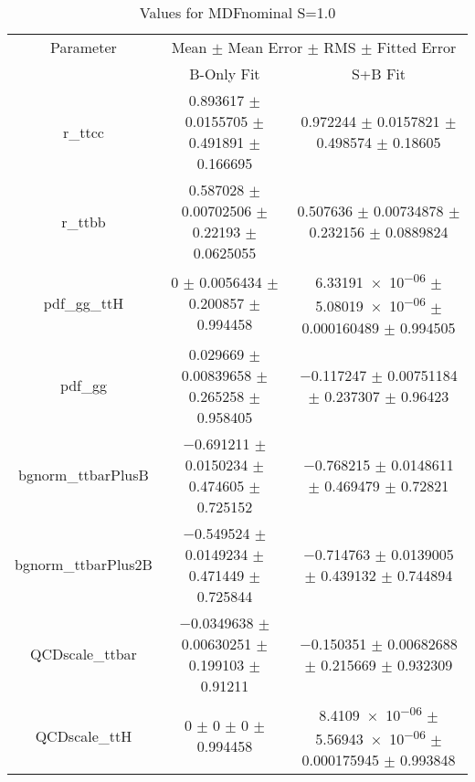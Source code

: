 \begin{table}
\centering
\caption{Values for MDFnominal S=1.0}
\begin{tabular}{ccc}
\toprule
Parameter & \multicolumn{2}{c}{Mean $\pm$ Mean Error $\pm$ RMS $\pm$ Fitted Error}\\
 & B-Only Fit & S+B Fit\\
\midrule
r\_ttcc & \num{0.893617} $\pm$ \num{0.0155705} $\pm$ \num{0.491891} $\pm$ \num{0.166695} & \num{0.972244} $\pm$ \num{0.0157821} $\pm$ \num{0.498574} $\pm$ \num{0.18605}\\
r\_ttbb & \num{0.587028} $\pm$ \num{0.00702506} $\pm$ \num{0.22193} $\pm$ \num{0.0625055} & \num{0.507636} $\pm$ \num{0.00734878} $\pm$ \num{0.232156} $\pm$ \num{0.0889824}\\
pdf\_gg\_ttH & \num{0} $\pm$ \num{0.0056434} $\pm$ \num{0.200857} $\pm$ \num{0.994458} & \num{6.33191e-06} $\pm$ \num{5.08019e-06} $\pm$ \num{0.000160489} $\pm$ \num{0.994505}\\
pdf\_gg & \num{0.029669} $\pm$ \num{0.00839658} $\pm$ \num{0.265258} $\pm$ \num{0.958405} & \num{-0.117247} $\pm$ \num{0.00751184} $\pm$ \num{0.237307} $\pm$ \num{0.96423}\\
bgnorm\_ttbarPlusB & \num{-0.691211} $\pm$ \num{0.0150234} $\pm$ \num{0.474605} $\pm$ \num{0.725152} & \num{-0.768215} $\pm$ \num{0.0148611} $\pm$ \num{0.469479} $\pm$ \num{0.72821}\\
bgnorm\_ttbarPlus2B & \num{-0.549524} $\pm$ \num{0.0149234} $\pm$ \num{0.471449} $\pm$ \num{0.725844} & \num{-0.714763} $\pm$ \num{0.0139005} $\pm$ \num{0.439132} $\pm$ \num{0.744894}\\
QCDscale\_ttbar & \num{-0.0349638} $\pm$ \num{0.00630251} $\pm$ \num{0.199103} $\pm$ \num{0.91211} & \num{-0.150351} $\pm$ \num{0.00682688} $\pm$ \num{0.215669} $\pm$ \num{0.932309}\\
QCDscale\_ttH & \num{0} $\pm$ \num{0} $\pm$ \num{0} $\pm$ \num{0.994458} & \num{8.4109e-06} $\pm$ \num{5.56943e-06} $\pm$ \num{0.000175945} $\pm$ \num{0.993848}\\
\bottomrule
\end{tabular}
\end{table}